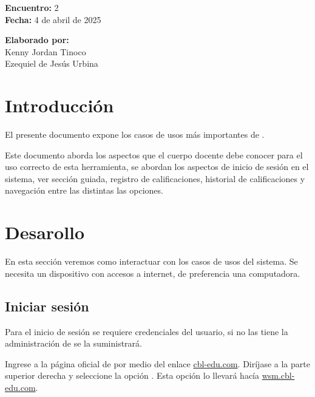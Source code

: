 \documentclass[12pt]{article}
\begin{document}
    \begin{multicols}{2}
        \textbf{Encuentro:} 2\\
        \textbf{Fecha:} 4 de abril de 2025\\
        \begin{flushright}
            \textbf{Elaborado por:}\\
            Kenny Jordan Tinoco\\
            Ezequiel de Jesús Urbina
        \end{flushright}
    \end{multicols}

    \tableofcontents
    \thispagestyle{fancy}

    \section{Introducción}

    El presente documento expone los casos de usos más importantes de \wsm.

    Este documento aborda los aspectos que el cuerpo docente debe conocer para el uso correcto de
    esta herramienta, se abordan los aspectos de inicio de sesión en el sistema, ver sección guiada, registro de
    calificaciones, historial de calificaciones y navegación entre las distintas las opciones.

    \section{Desarollo}

    En esta sección veremos como interactuar con los casos de usos del sistema.
    Se necesita un dispositivo con accesos a internet, de preferencia una computadora.

    \subsection{Iniciar sesión}

    Para el inicio de sesión se requiere credenciales del usuario, si no las tiene la administración de \cbl se la suministrará.

    \stepTitle

     Ingrese a la página oficial de \cbl por medio del enlace \href{www.cbl-edu.com}{cbl-edu.com}.
     Diríjase a la parte superior derecha y seleccione la opción .
    Esta opción lo llevará hacía \href{wsm.cbl-edu.com}{wsm.cbl-edu.com}.
\end{document}
